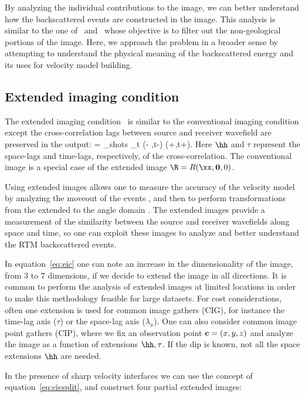By analyzing the individual contributions to the image, we can better understand how the backscattered events
are constructed in the image. This analysis is similar to the one of~\cite{fei:3130} and~\cite{liu:S29}
whose objective is to filter out the non-geological portions of the image. Here, we approach the problem 
in a broader sense by attempting to understand the physical meaning of the backscattered energy and its
uses for velocity model building.



\subsection{Extended imaging condition}

The extended imaging condition~\citep{rickett:883,sava:S209,GPR:GPR888} is similar to the conventional imaging condition
 except the cross-correlation lags between source and receiver wavefield are preserved in the output:
\beq
\Re= \sum_{shots} \sum_{t} \US(\xx - \hh,t-\tau) \UR(\xx+\hh,t+\tau).
\label{eq:eic}
\eeq
Here $\hh$ and $\tau$ represent the space-lags and time-lags, respectively, of the cross-correlation.
%
The conventional image is a special case of the extended image $\R=R(\xx,{\bf 0},0)$.

Using extended images allows one to measure the accuracy of the velocity model by analyzing the moveout of the events
 \citep{yang:S151}, and then to perform transformations from the extended to the angle domain 
\citep{sava:1065,sava:S209,sava:S131}. The extended images provide a measurement of the similarity between the source
 and receiver wavefields along space and time, so one can exploit these images to analyze and better understand the RTM backscattered events.

In equation~\ref{eq:eic} one can note an increase in the dimensionality of the image, from 3 to 7 dimensions,
if we decide to extend the image in all directions. It is common to perform the analysis 
of extended images at limited locations in order to make this methodology feasible for large datasets. 
For cost considerations, often one extension is used for common image gathers (CIG), for instance
 the time-lag axis ($\tau$) or the space-lag axis ($\lambda_x$). One can also consider 
 common image point gathers (CIP), where we 
fix an observation point ${\bf c}=(x,y,z)$ and analyze the image as a function of extensions $\hh,\tau$. If the dip is known,
not all the space extensions $\hh$ are needed.  

In the presence of sharp velocity interfaces we can use the concept of equation~\ref{eq:cicsplit}, and construct four partial 
extended images:

